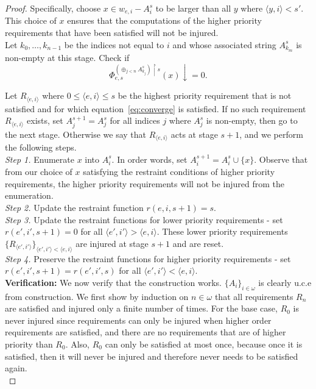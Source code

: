 \documentclass{article}
\begin{document}
\begin{proof}
    Specifically, choose $x\in w_{e,i}-A_i^s$ to be larger than all $y$
    where $\langle y,i\rangle <s'$. This choice of $x$ ensures that the
    computations of the higher priority requirements that have been
    satisfied will not be injured. \\

    Let $k_0,\ldots,k_{n-1}$ be the indices not equal to $i$ and whose
    associated string $A_{k_m}^s$ is non-empty at this stage. Check if
    \begin{equation}
      \Phi_{e,s}^{(\oplus_{j<n} A_{k_j}^s) \restriction s}(x)
      \downarrow=0.
      \label{eq:converge}
    \end{equation}

    Let $R_{\langle e,i\rangle}$ where $0\leq \langle e,i\rangle \leq
    s$ be the highest priority requirement that is not satisfied and
    for which equation~\eqref{eq:converge} is satisfied. If no such
    requirement $R_{\langle e,i\rangle}$ exists, set
    $A_j^{s+1}=A_j^s$ for all indices $j$ where $A_j^s$ is non-empty,
    then go to the next stage. Otherwise we say that $R_{\langle
    e,i\rangle}$ acts at stage $s+1$, and we perform the following
    steps. \\

    \textit{Step 1.} Enumerate $x$ into $A_i^s$. In order words, set
    $A_i^{s+1}=A_i^s\cup\{x\}$. Observe that from our choice of $x$
    satisfying the restraint conditions of higher priority
    requirements, the higher priority requirements will not be injured
    from the enumeration. \\

    \textit{Step 2.} Update the restraint function $r(e,i,s+1)=s$. \\

    \textit{Step 3.} Update the restraint functions for lower priority
    requirements - set $r(e',i',s+1)=0$ for all $\langle e',i'\rangle
    >\langle e,i\rangle$. These lower priority requirements
    $\{R_{\langle e',i'\rangle}\}_{\langle e',i'\rangle <\langle
    e,i\rangle}$ are injured at stage $s+1$ and are reset. \\

    \textit{Step 4.} Preserve the restraint functions for higher
    priority requirements - set $r(e',i',s+1)=r(e',i',s)$ for all
    $\langle e',i'\rangle <\langle e,i\rangle$. \\

    \textbf{Verification:} We now verify that the construction works.
    $\{A_i\}_{i\in\omega}$ is clearly u.c.e from construction. We first
    show by induction on $n\in\omega$ that all
    requirements $R_{n}$ are satisfied and injured
    only a finite number of times. For the base case, $R_0$ is never
    injured since requirements can only be injured when higher order
    requirements are satisfied, and there are no requirements that are
    of higher priority than $R_0$. Also, $R_0$ can only be satisfied at
    most once, because once it is satisfied, then it will never be
    injured and therefore never needs to be satisfied again. \\


\end{proof}
\end{document}
